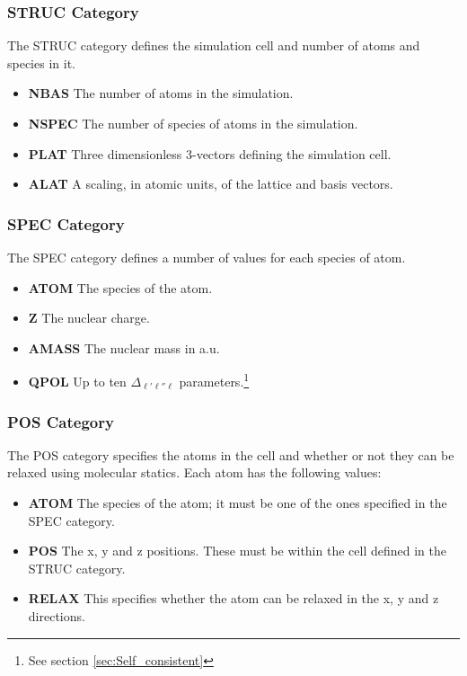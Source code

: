 \documentclass{article}
\begin{document}
\begin{multicols}{2}
\subsubsection{STRUC Category} The STRUC category defines the simulation cell and number of atoms and species in it.
\begin{itemize}
	\item{\textbf{NBAS} The number of atoms in the simulation.}
	\item{\textbf{NSPEC} The number of species of atoms in the simulation.}
	\item{\textbf{PLAT} Three dimensionless 3-vectors defining the simulation cell.}
	\item{\textbf{ALAT} A scaling, in atomic units, of the lattice and basis vectors.}
\end{itemize}

\subsubsection{SPEC Category} The SPEC category defines a number of values for each species of atom.
\begin{itemize}
	\item{\textbf{ATOM} The species of the atom.}
	\item{\textbf{Z} The nuclear charge.}
	\item{\textbf{AMASS} The nuclear mass in a.u.}
	\item{\textbf{QPOL} Up to ten $\Delta_{\ell'\ell''\ell}$ parameters.\footnote{See section \ref{sec:Self_consistent}}}
\end{itemize}
\subsubsection{POS Category} The POS category specifies the atoms in the cell and whether or not they can be relaxed using molecular statics. Each atom has the following values:
\begin{itemize}
	\item{\textbf{ATOM} The species of the atom; it must be one of the ones specified in the SPEC category.}
	\item{\textbf{POS} The x, y and z positions. These must be within the cell defined in the STRUC category.}
	\item{\textbf{RELAX} This specifies whether the atom can be relaxed in the x, y and z directions.}
\end{itemize}

\end{multicols}
\end{document}
